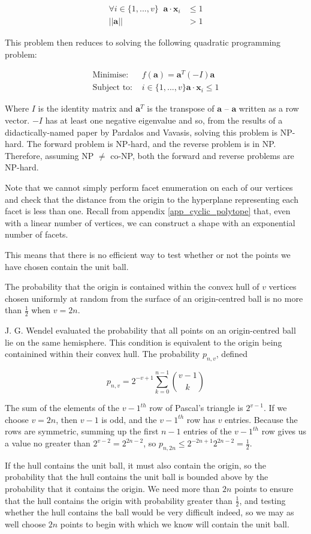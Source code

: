 \begin{align*}
\forall i \in \{1, ..., v\}\;\; {\bm a} \cdot {\bm x}_i &\leqslant 1 \\
||{\bm a}|| &> 1
\end{align*}

This problem then reduces to solving the following quadratic programming problem:

\begin{align*}
\mbox{Minimise: }& f({\bm a}) = {\bm a}^T (-I) {\bm a} \\
\mbox{Subject to: }& i \in \{1, ..., v\} {\bm a} \cdot {\bm x}_i \leqslant 1 
\end{align*}

Where $I$ is the identity matrix and ${\bm a}^T$ is the transpose of ${\bm a}$ -- ${\bm a}$ written as a row vector. $-I$ has at least one negative eigenvalue and so, from the results of a didactically-named paper by Pardalos and Vavasis\cite{Pardalos91}, solving this problem is NP-hard. The forward problem is NP-hard, and the reverse problem is in NP. Therefore, assuming NP $\neq$ co-NP, both the forward and reverse problems are NP-hard.

Note that we cannot simply perform facet enumeration on each of our vertices and check that the distance from the origin to the hyperplane representing each facet is less than one. Recall from appendix \ref{app_cyclic_polytope} that, even with a linear number of vertices, we can construct a shape with an exponential number of facets.

This means that there is no efficient way to test whether or not the points we have chosen contain the unit ball.

\begin{proposition}
The probability that the origin is contained within the convex hull of $v$ vertices chosen uniformly at random from the surface of an origin-centred ball is no more than $\frac{1}{2}$ when $v = 2n$.
\end{proposition}

J. G. Wendel evaluated the probability that all points on an origin-centred ball lie on the same hemisphere. This condition is equivalent to the origin being containined within their convex hull. The probability $p_{n,v}$, defined

$$
p_{n,v} = 2^{-v+1} \sum_{k=0}^{n-1} {{v-1} \choose k}
$$

The sum of the elements of the $v-1^{th}$ row of Pascal's triangle is $2^{v-1}$. If we choose $v = 2n$, then $v-1$ is odd, and the $v-1^{th}$ row has $v$ entries. Because the rows are symmetric, summing up the first $n-1$ entries of the $v-1^{th}$ row gives us a value no greater than $2^{v-2} = 2^{2n-2}$, so $p_{n, 2n} \leqslant 2^{-2n+1} 2^{2n-2} = \frac{1}{2}$.

If the hull contains the unit ball, it must also contain the origin, so the probability that the hull contains the unit ball is bounded above by the probability that it contains the origin. We need more than $2n$ points to ensure that the hull contains the origin with probability greater than $\frac{1}{2}$, and testing whether the hull contains the ball would be very difficult indeed, so we may as well choose $2n$ points to begin with which we know will contain the unit ball.